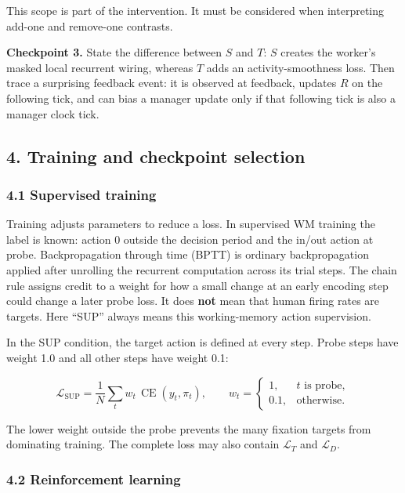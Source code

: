 \documentclass[
  10pt,
]{article}
\begin{document}
This scope is part of the intervention. It must be considered when
interpreting add-one and remove-one contrasts.

\textbf{Checkpoint 3.} State the difference between \(S\) and \(T\):
\(S\) creates the worker's masked local recurrent wiring, whereas \(T\)
adds an activity-smoothness loss. Then trace a surprising feedback
event: it is observed at feedback, updates \(R\) on the following tick,
and can bias a manager update only if that following tick is also a
manager clock tick.

\hypertarget{training-and-checkpoint-selection}{%
\subsection{4. Training and checkpoint
selection}\label{training-and-checkpoint-selection}}

\hypertarget{supervised-training}{%
\subsubsection{4.1 Supervised training}\label{supervised-training}}

Training adjusts parameters to reduce a loss. In supervised WM training
the label is known: action 0 outside the decision period and the in/out
action at probe. Backpropagation through time (BPTT) is ordinary
backpropagation applied after unrolling the recurrent computation across
its trial steps. The chain rule assigns credit to a weight for how a
small change at an early encoding step could change a later probe loss.
It does \textbf{not} mean that human firing rates are targets. Here
``SUP'' always means this working-memory action supervision.

In the SUP condition, the target action is defined at every step. Probe
steps have weight 1.0 and all other steps have weight 0.1:

\[
\mathcal L_{\mathrm{SUP}}
=
\frac{1}{N}
\sum_t w_t\,
\operatorname{CE}(y_t,\pi_t),
\qquad
w_t=
\begin{cases}
1,&t\text{ is probe},\\
0.1,&\text{otherwise}.
\end{cases}
\]

The lower weight outside the probe prevents the many fixation targets
from dominating training. The complete loss may also contain
\(\mathcal L_T\) and \(\mathcal L_D\).

\hypertarget{reinforcement-learning}{%
\subsubsection{4.2 Reinforcement
learning}\label{reinforcement-learning}}
\end{document}
